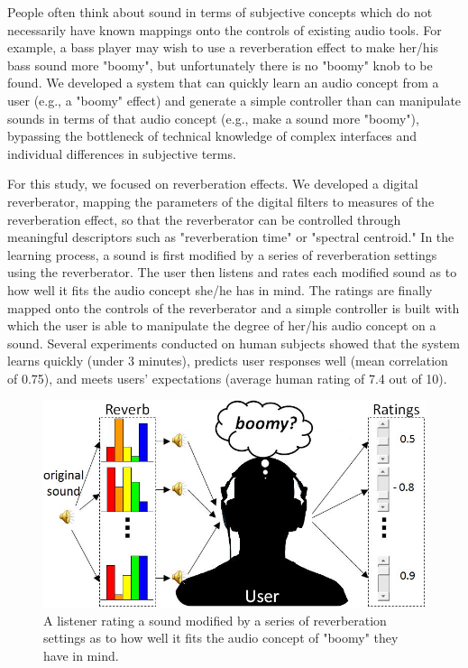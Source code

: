\documentclass{article}
\begin{document}
People often think about sound in terms of subjective concepts which do not necessarily have known mappings onto the controls of existing audio tools. For example, a bass player may wish to use a reverberation effect to make her/his bass sound more "boomy", but unfortunately there is no "boomy" knob to be found. We developed a system that can quickly learn an audio concept from a user (e.g., a "boomy" effect) and generate a simple controller than can manipulate sounds in terms of that audio concept (e.g., make a sound more "boomy"), bypassing the bottleneck of technical knowledge of complex interfaces and individual differences in subjective terms.

For this study, we focused on reverberation effects. We developed a digital reverberator, mapping the parameters of the digital filters to measures of the reverberation effect, so that the reverberator can be controlled through meaningful descriptors such as "reverberation time" or "spectral centroid." In the learning process, a sound is first modified by a series of reverberation settings using the reverberator. The user then listens and rates each modified sound as to how well it fits the audio concept she/he has in mind. The ratings are finally mapped onto the controls of the reverberator and a simple controller is built with which the user is able to manipulate the degree of her/his audio concept on a sound. Several experiments conducted on human subjects showed that the system learns quickly (under 3 minutes), predicts user responses well (mean correlation of 0.75), and meets users' expectations (average human rating of 7.4 out of 10).

\begin{figure}[htb]
\centering
\includegraphics[width=\columnwidth]{Images/reverberation.jpg}
\caption{A listener rating a sound modified by a series of reverberation settings as to how well it fits the audio concept of "boomy" they have in mind.}
\label{fig:reverb}
\end{figure}
\end{document}
